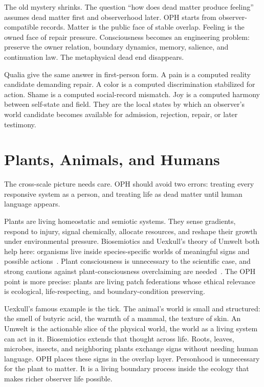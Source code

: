 \documentclass[11pt]{article}
\theoremstyle{remark}
\theoremstyle{plain}
\begin{document}
The old mystery shrinks. The question ``how does dead matter produce feeling''
assumes dead matter first and observerhood later. OPH starts from
observer-compatible records. Matter is the public face of stable overlap.
Feeling is the owned face of repair pressure. Consciousness becomes an
engineering problem: preserve the owner relation, boundary dynamics, memory,
salience, and continuation law. The metaphysical dead end disappears.

Qualia give the same answer in first-person form. A pain is a computed reality
candidate demanding repair. A color is a computed discrimination stabilized for
action. Shame is a computed social-record mismatch. Joy is a computed harmony
between self-state and field. They are the local states by which an observer's
world candidate becomes available
for admission, rejection, repair, or later testimony.

\section{Plants, Animals, and Humans}

The cross-scale picture needs care. OPH should avoid two errors: treating
every responsive system as a person, and treating life as dead matter until
human language appears.

Plants are living homeostatic and semiotic systems. They sense gradients,
respond to injury, signal chemically, allocate resources, and reshape their
growth under environmental pressure. Biosemiotics and Uexkull's theory of
Umwelt both help here: organisms live inside species-specific worlds of
meaningful signs and possible actions~\cite{Uexkull1934,Hoffmeyer2008,Hornborg2024}.
Plant consciousness is unnecessary to the scientific case, and strong cautions
against plant-consciousness overclaiming are needed~\cite{Taiz2019}. The
OPH point is more precise: plants are living patch
federations whose ethical relevance is ecological, life-respecting, and
boundary-condition preserving.

Uexkull's famous example is the tick. The animal's world is small and
structured: the smell of butyric acid, the warmth of a mammal, the texture of
skin. An Umwelt is the actionable slice of the physical world, the world as a
living system can act in it. Biosemiotics extends that thought across life.
Roots, leaves,
microbes, insects, and neighboring plants exchange signs without needing human
language. OPH places these signs in the overlap layer. Personhood is unnecessary
for the plant to matter. It is a living boundary process inside the ecology that
makes richer observer life possible.
\end{document}

